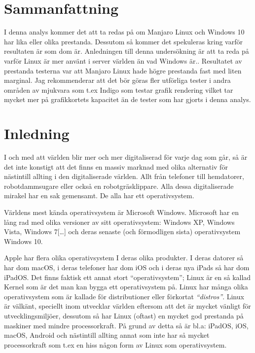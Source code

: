 \documentclass[12pt, a4paper]{report}
\begin{document}
\section{Sammanfattning}\label{sum}

I denna analys kommer det att ta redas på om Manjaro Linux och Windows 10 har lika eller olika prestanda. Dessutom så kommer det spekuleras kring varför resultaten är som dom är. Anledningen till denna undersökning är att ta reda på varför Linux är mer använt i server världen än vad Windows är.\cite{linux-market}. Resultatet av prestanda testerna var att Manjaro Linux hade högre prestanda fast med liten marginal. Jag rekommenderar att det bör göras fler utförliga tester i andra områden av mjukvara som t.ex Indigo\cite{indigo} som testar grafik rendering vilket tar mycket mer på grafikkortets kapacitet än de tester som har gjorts i denna analys.


\vspace{1cm}

    
\section{Inledning}
 
 
   I och med att världen blir mer och mer digitaliserad för varje dag som går, så är det inte konstigt att det finns en massiv marknad med olika alternativ för nästintill allting i den digitaliserade världen. Allt från telefoner till hemdatorer, robotdammsugare eller också en robotgräsklippare. Alla dessa digitaliserade mirakel har en sak gemensamt. De alla har ett operativsystem.
 
   Världens mest kända operativsystem\cite{winstat} är Microsoft Windows. Microsoft har en lång rad med olika versioner av sitt operativsystem\cite{windows}: Windows XP, Windows Vista, Windows 7[\dots] och deras senaste (och förmodligen sista) operativsystem Windows 10.
    
   Apple har flera olika operativsystem I deras olika produkter. I deras datorer så har dom macOS, i deras telefoner har dom iOS och i deras nya iPads så har dom iPadOS.\cite{appleOS}
    Det finns faktisk ett annat stort ``operativsystem''; Linux är en så kallad Kernel \cite{redhat} som är det man kan bygga ett operativsystem på. Linux har många olika operativsystem som är kallade för distributioner eller förkortat \textit{``distros''}. Linux är välkänt, speciellt inom utvecklar världen eftersom att det är mycket vänligt för utvecklingsmiljöer, dessutom så har Linux (oftast) en mycket god prestanda på maskiner med mindre processorkraft\cite{whatislinux}. På grund av detta så är bl.a: iPadOS, iOS, macOS, Android och nästintill allting annat som inte har så mycket processorkraft som t.ex en hiss någon form av Linux som operativsystem.
\end{document}
